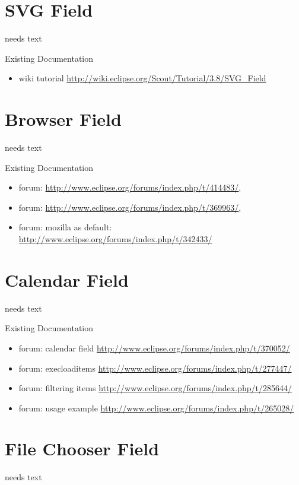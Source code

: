 \documentclass[a4paper,10pt,twoside]{book}
\begin{document}
\section{SVG Field}
needs text

\noindent Existing Documentation
\begin{itemize}
  \item wiki tutorial \url{http://wiki.eclipse.org/Scout/Tutorial/3.8/SVG_Field}
\end{itemize}

\section{Browser Field}
needs text

\noindent Existing Documentation
\begin{itemize}
  \item forum: \url{http://www.eclipse.org/forums/index.php/t/414483/}, 
  \item forum: \url{http://www.eclipse.org/forums/index.php/t/369963/}, 
  \item forum: mozilla as default: \url{http://www.eclipse.org/forums/index.php/t/342433/}
\end{itemize}

\section{Calendar Field}
needs text

\noindent Existing Documentation
\begin{itemize}
  \item forum: calendar field \url{http://www.eclipse.org/forums/index.php/t/370052/}
  \item forum: execloaditems \url{http://www.eclipse.org/forums/index.php/t/277447/}
  \item forum: filtering items \url{http://www.eclipse.org/forums/index.php/t/285644/}
  \item forum: usage example \url{http://www.eclipse.org/forums/index.php/t/265028/}
\end{itemize}

\section{File Chooser Field}
needs text
\end{document}
